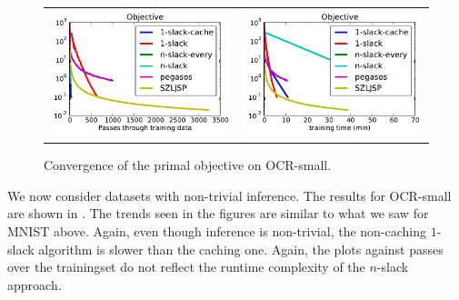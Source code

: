 \begin{figure}
    \begin{tabu} to 
    \includegraphics[width=\linewidth]{evaluation/images/letters_small}&%
    \includegraphics[width=\linewidth]{evaluation/images/letters_small_time}
    \end{tabu}
\caption{%
   Convergence of the primal objective on OCR-small. 
}
\end{figure}

We now consider datasets with non-trivial inference.
The results for OCR-small are shown in .
The trends seen in the figures are similar to what we saw for MNIST above.
Again, even though inference is non-trivial, the non-caching $1$-slack
algorithm is slower than the caching one. Again, the plots against passes over the trainingset
do not reflect the runtime complexity of the $n$-slack approach.

